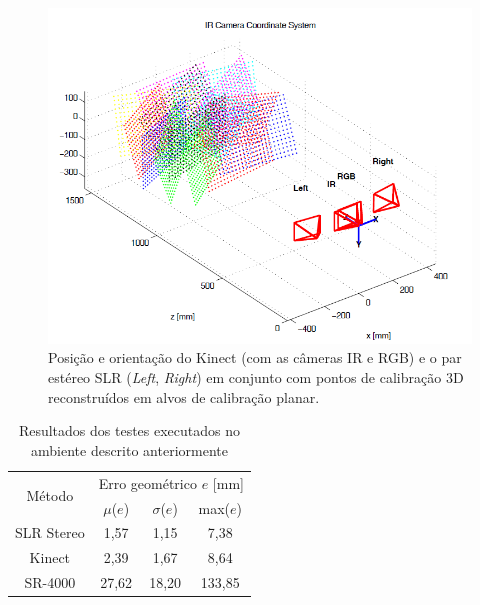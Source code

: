 \begin{figure}[!h]
	\centering
	\includegraphics[width=1\linewidth]{figs/ambientekinect.png}
	\caption{%
	Posição e orientação do Kinect (com as câmeras IR e RGB) e o par estéreo SLR ({\it Left}, {\it Right}) em conjunto com pontos de calibração 3D reconstruídos em alvos de calibração planar.
	}\label{fig:ambienteKinect}
\end{figure}

\begin{table}[htbp]
\caption{Resultados dos testes executados no ambiente descrito anteriormente}
\label{tab:resultadosKinect}
\begin{center}
\begin{tabular}{|c|c|c|c|}
\hline
\multirow{2}{1.5cm}{Método}& \multicolumn{3}{p{5cm}|}{Erro geométrico $e$ [mm]} \bigstrut \\
\cline{2-4} & \multicolumn{1}{c|}{$\mu$($e$)} & \multicolumn{1}{c|}{$\sigma$($e$)} & \multicolumn{1}{c|}{max($e$)} \bigstrut \\ \hline
SLR Stereo & 1,57 & 1,15 & 7,38 \bigstrut \\ \hline
Kinect & 2,39 & 1,67 & 8,64 \bigstrut \\ \hline
SR-4000 & 27,62 & 18,20 & 133,85 \bigstrut \\ 
\hline
\end{tabular}
\end{center}
\end{table}



